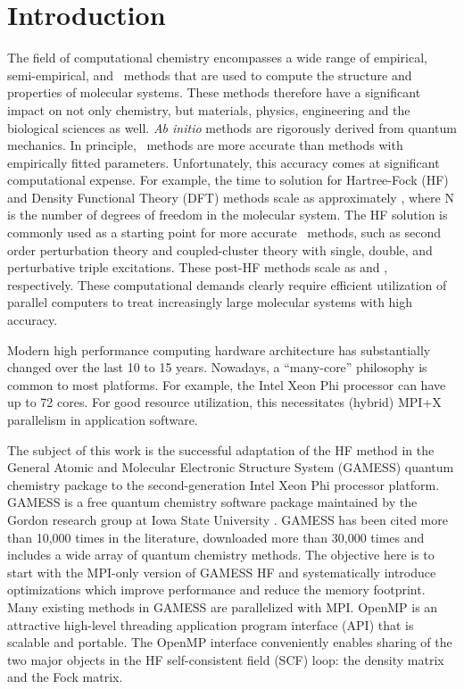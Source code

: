 \section{Introduction}
The field of computational chemistry encompasses a wide range of empirical, semi-empirical, and \abinitio\ methods that are used to compute the structure and properties of molecular systems. These methods therefore have a significant impact on not only chemistry, but materials, physics, engineering and the biological sciences as well. \textit{Ab initio} methods are rigorously derived from quantum mechanics. In principle, \abinitio\ methods are more accurate than methods with empirically fitted parameters. Unfortunately, this accuracy comes at significant computational expense. For example, the time to solution for Hartree-Fock (HF) and Density Functional Theory (DFT) methods scale as approximately , where N is the number of degrees of freedom in the molecular system. The HF solution is commonly used as a starting point for more accurate \abinitio\ methods, such as second order perturbation theory and coupled-cluster theory with single, double, and perturbative triple excitations. These post-HF methods scale as  and , respectively. These computational demands clearly require efficient utilization of parallel computers to treat increasingly large molecular systems with high accuracy.

Modern high performance computing hardware architecture has substantially changed over the last 10 to 15 years. Nowadays, a ``many-core'' philosophy is common to most platforms. For example, the Intel Xeon Phi processor can have up to 72 cores. For good resource utilization, this necessitates (hybrid) MPI+X parallelism in application software.

The subject of this work is the successful adaptation of the HF method in the General Atomic and Molecular Electronic Structure System (GAMESS) quantum chemistry package to the second-generation Intel Xeon Phi processor platform. GAMESS is a free quantum chemistry software package maintained by the Gordon research group at Iowa State University \cite{gordon2005advances}. GAMESS has been cited more than 10,000 times in the literature, downloaded more than 30,000 times and includes a wide array of quantum chemistry methods. The objective here is to start with the MPI-only version of GAMESS HF and systematically introduce optimizations which improve performance and reduce the memory footprint. Many existing methods in GAMESS are parallelized with MPI. OpenMP is an attractive high-level threading application program interface (API) that is scalable and portable. The OpenMP interface conveniently enables sharing of the two major objects in the HF self-consistent field (SCF) loop: the density matrix and the Fock matrix.

